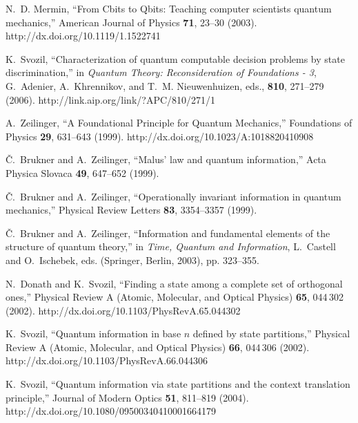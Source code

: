 \documentclass{article}
\begin{document}
\begin{thebibliography}{10}
N.~D. Mermin, \enquote{From {C}bits to {Q}bits: Teaching computer scientists
  quantum mechanics,} American Journal of Physics {\bf 71}, 23--30 (2003).
\newline http://dx.doi.org/10.1119/1.1522741

K.~Svozil, \enquote{Characterization of quantum computable decision problems by
  state discrimination,} in {\em Quantum Theory: Reconsideration of Foundations
  - 3\/}, G.~Adenier, A.~Khrennikov, and T.~M. Nieuwenhuizen, eds.,  {\bf 810},
  271--279 (2006).
\newline http://link.aip.org/link/?APC/810/271/1

A.~Zeilinger, \enquote{A Foundational Principle for Quantum Mechanics,}
  Foundations of Physics {\bf 29}, 631--643 (1999).
\newline http://dx.doi.org/10.1023/A:1018820410908

{\v{C}}.~Brukner and A.~Zeilinger, \enquote{Malus' law and quantum
  information,} Acta Physica Slovaca {\bf 49}, 647--652 (1999).

{\v{C}}.~Brukner and A.~Zeilinger, \enquote{Operationally invariant information
  in quantum mechanics,} Physical Review Letters {\bf 83}, 3354--3357 (1999).

{\v{C}}.~Brukner and A.~Zeilinger, \enquote{Information and fundamental
  elements of the structure of quantum theory,} in {\em Time, Quantum and
  Information\/}, L.~Castell and O.~Ischebek, eds.  (Springer, Berlin, 2003),
  pp. 323--355.

N.~Donath and K.~Svozil, \enquote{Finding a state among a complete set of
  orthogonal ones,} Physical Review A (Atomic, Molecular, and Optical Physics)
  {\bf 65}, 044\,302 (2002).
\newline http://dx.doi.org/10.1103/PhysRevA.65.044302

K.~Svozil, \enquote{Quantum information in base $n$ defined by state
  partitions,} Physical Review A (Atomic, Molecular, and Optical Physics) {\bf
  66}, 044\,306 (2002).
\newline http://dx.doi.org/10.1103/PhysRevA.66.044306

K.~Svozil, \enquote{Quantum information via state partitions and the context
  translation principle,} Journal of Modern Optics {\bf 51}, 811--819 (2004).
\newline http://dx.doi.org/10.1080/09500340410001664179


\end{thebibliography}
\end{document}
